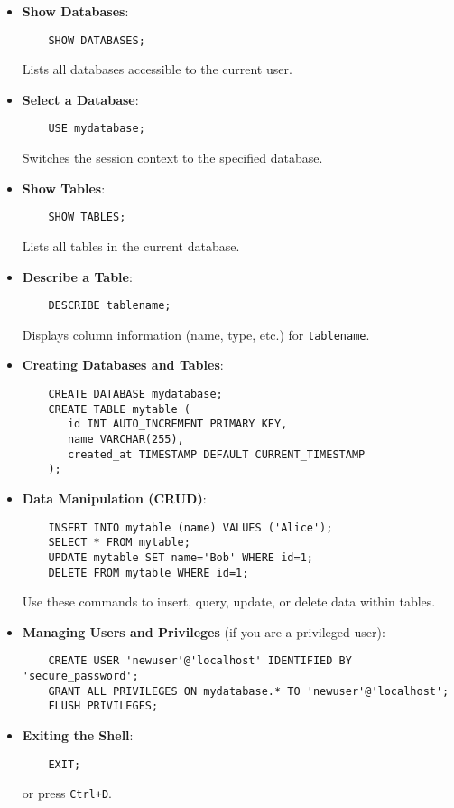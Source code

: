 \documentclass[10pt]{article}
\begin{document}
\begin{itemize}
    \item \textbf{Show Databases}:
    \begin{lstlisting}
    SHOW DATABASES;
    \end{lstlisting}
    Lists all databases accessible to the current user.

    \item \textbf{Select a Database}:
    \begin{lstlisting}
    USE mydatabase;
    \end{lstlisting}
    Switches the session context to the specified database.

    \item \textbf{Show Tables}:
    \begin{lstlisting}
    SHOW TABLES;
    \end{lstlisting}
    Lists all tables in the current database.

    \item \textbf{Describe a Table}:
    \begin{lstlisting}
    DESCRIBE tablename;
    \end{lstlisting}
    Displays column information (name, type, etc.) for \texttt{tablename}.

    \item \textbf{Creating Databases and Tables}:
    \begin{lstlisting}
    CREATE DATABASE mydatabase;
    CREATE TABLE mytable (
       id INT AUTO_INCREMENT PRIMARY KEY,
       name VARCHAR(255),
       created_at TIMESTAMP DEFAULT CURRENT_TIMESTAMP
    );
    \end{lstlisting}

    \item \textbf{Data Manipulation (CRUD)}:
    \begin{lstlisting}
    INSERT INTO mytable (name) VALUES ('Alice');
    SELECT * FROM mytable;
    UPDATE mytable SET name='Bob' WHERE id=1;
    DELETE FROM mytable WHERE id=1;
    \end{lstlisting}
    Use these commands to insert, query, update, or delete data within tables.

    \item \textbf{Managing Users and Privileges} (if you are a privileged user):
    \begin{lstlisting}
    CREATE USER 'newuser'@'localhost' IDENTIFIED BY 'secure_password';
    GRANT ALL PRIVILEGES ON mydatabase.* TO 'newuser'@'localhost';
    FLUSH PRIVILEGES;
    \end{lstlisting}

    \item \textbf{Exiting the Shell}:
    \begin{lstlisting}
    EXIT;
    \end{lstlisting}
    or press \texttt{Ctrl+D}.
\end{itemize}
\end{document}
